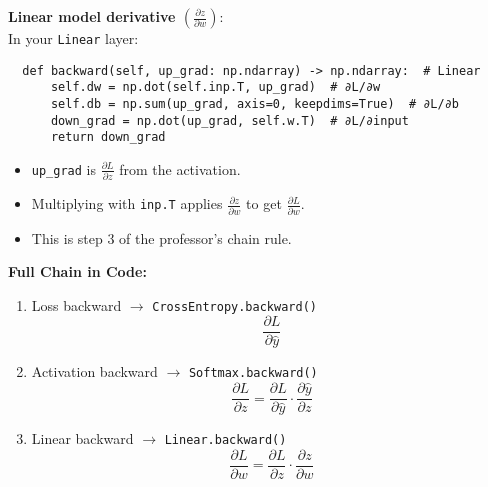 \documentclass{article}
\newenvironment{cheatformula}[1][כותרת]{
    \begin{minipage}{\linewidth}
    \textbf{#1}: \\
}{
    \end{minipage}\\[0ex]
}
\begin{document}
  \begin{cheatformula}[Linear model derivative $\left(\frac{\partial z}{\partial w}\right)$]
  In your \texttt{Linear} layer:
  
  \begin{lstlisting}
  def backward(self, up_grad: np.ndarray) -> np.ndarray:  # Linear
      self.dw = np.dot(self.inp.T, up_grad)  # ∂L/∂w
      self.db = np.sum(up_grad, axis=0, keepdims=True)  # ∂L/∂b
      down_grad = np.dot(up_grad, self.w.T)  # ∂L/∂input
      return down_grad
  \end{lstlisting}
  
  \begin{itemize}
      \item \texttt{up\_grad} is $\frac{\partial L}{\partial z}$ from the activation.
      \item Multiplying with \texttt{inp.T} applies $\frac{\partial z}{\partial w}$ to get $\frac{\partial L}{\partial w}$.
      \item This is step 3 of the professor’s chain rule.
  \end{itemize}

  
  \noindent\textbf{Full Chain in Code:}
  \begin{enumerate}
      \item Loss backward $\rightarrow$ \texttt{CrossEntropy.backward()}
      \[
      \frac{\partial L}{\partial \hat{y}}
      \]
      \item Activation backward $\rightarrow$ \texttt{Softmax.backward()}
      \[
      \frac{\partial L}{\partial z} = \frac{\partial L}{\partial \hat{y}} \cdot \frac{\partial \hat{y}}{\partial z}
      \]
      \item Linear backward $\rightarrow$ \texttt{Linear.backward()}
      \[
      \frac{\partial L}{\partial w} = \frac{\partial L}{\partial z} \cdot \frac{\partial z}{\partial w}
      \]
  \end{enumerate}

  \end{cheatformula}
    
  
  
  
\end{document}
